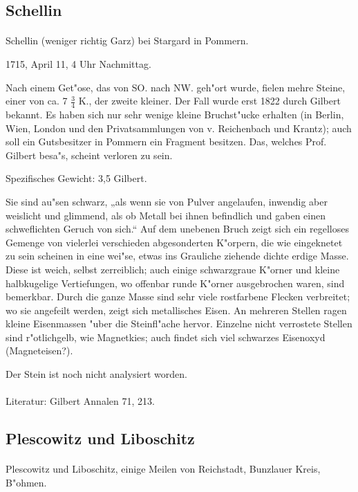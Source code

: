 \documentclass[a4paper, 11pt, oneside]{article}
\begin{document}
\subsection{Schellin}
\normalsize
\paragraph{}
Schellin (weniger richtig Garz) bei Stargard in Pommern.

1715, April 11, 4 Uhr Nachmittag.

Nach einem Get"ose, das von SO. nach NW. geh"ort wurde, fielen mehre Steine, einer von ca. 7 $\frac{3}{4}$ K., der zweite kleiner. Der Fall wurde erst 1822 durch Gilbert bekannt. Es haben sich nur sehr wenige kleine Bruchst"ucke erhalten (in Berlin, Wien, London und den Privatsammlungen von v. Reichenbach und Krantz); auch soll ein Gutsbesitzer in Pommern ein Fragment besitzen. Das, welches Prof. Gilbert besa"s, scheint verloren zu sein.

Spezifisches Gewicht: 3,5 Gilbert.

Sie sind au"sen schwarz, „als wenn sie von Pulver angelaufen, inwendig aber weislicht und glimmend, als ob Metall bei ihnen befindlich und gaben einen schweflichten Geruch von sich.“ Auf dem unebenen Bruch zeigt sich ein regelloses Gemenge von vielerlei verschieden abgesonderten K"orpern, die wie eingeknetet zu sein scheinen in eine wei"se, etwas ins Grauliche ziehende dichte erdige Masse. Diese ist weich, selbst zerreiblich; auch einige schwarzgraue K"orner und kleine halbkugelige Vertiefungen, wo offenbar runde K"orner ausgebrochen waren, sind bemerkbar. Durch die ganze Masse sind sehr viele rostfarbene Flecken verbreitet; wo sie angefeilt werden, zeigt sich metallisches Eisen. An mehreren Stellen ragen kleine Eisenmassen "uber die Steinfl"ache hervor. Einzelne nicht verrostete Stellen sind r"otlichgelb, wie Magnetkies; auch findet sich viel schwarzes Eisenoxyd (Magneteisen?).

Der Stein ist noch nicht analysiert worden.
\footnotesize
\paragraph{}
Literatur: Gilbert Annalen 71, 213.
\subsection{Plescowitz und Liboschitz}
\normalsize
\paragraph{}
Plescowitz und Liboschitz, einige Meilen von Reichstadt, Bunzlauer Kreis, B"ohmen.
\end{document}
